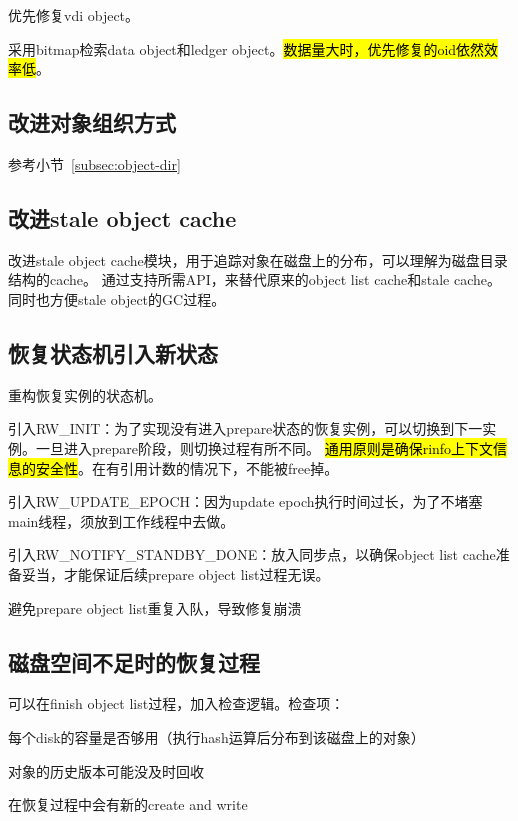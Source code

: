 优先修复vdi object。

采用bitmap检索data object和ledger object。\hl{数据量大时，优先修复的oid依然效率低}。

\subsection{改进对象组织方式}

参考小节~\ref{subsec:object-dir}

\subsection{改进stale object cache}

改进stale object cache模块，用于追踪对象在磁盘上的分布，可以理解为磁盘目录结构的cache。
通过支持所需API，来替代原来的object list cache和stale cache。同时也方便stale object的GC过程。

\subsection{恢复状态机引入新状态}

重构恢复实例的状态机。

引入RW\_INIT：为了实现没有进入prepare状态的恢复实例，可以切换到下一实例。一旦进入prepare阶段，则切换过程有所不同。
\hl{通用原则是确保rinfo上下文信息的安全性}。在有引用计数的情况下，不能被free掉。

引入RW\_UPDATE\_EPOCH：因为update epoch执行时间过长，为了不堵塞main线程，须放到工作线程中去做。

引入RW\_NOTIFY\_STANDBY\_DONE：放入同步点，以确保object list cache准备妥当，才能保证后续prepare object list过程无误。

避免prepare object list重复入队，导致修复崩溃

\subsection{磁盘空间不足时的恢复过程}

可以在finish object list过程，加入检查逻辑。检查项：
\begin{enumbox}
\item 每个disk的容量是否够用（执行hash运算后分布到该磁盘上的对象）
\item 对象的历史版本可能没及时回收
\item 在恢复过程中会有新的create and write
\end{enumbox}

